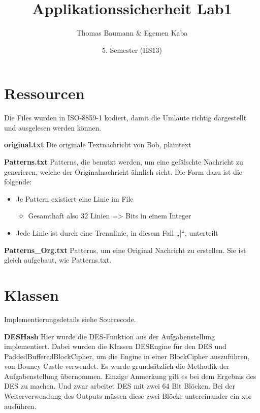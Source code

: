 \documentclass[10pt]{scrartcl}
\title{
\vspace{5cm}
Applikationssicherheit Lab1
}
\author{Thomas Baumann \& Egemen Kaba}
\date{5. Semester (HS13)}
\begin{document}
\maketitle
\thispagestyle{empty}

\newpage
{}

\section{Ressourcen}
Die Files wurden in ISO-8859-1 kodiert, damit die Umlaute richtig dargestellt und ausgelesen werden können.

\textbf{original.txt}\newline
Die originale Textnachricht von Bob, plaintext

\textbf{Patterns.txt}\newline
Patterns, die benutzt werden, um eine gefälschte Nachricht zu generieren, welche der Originalnachricht ähnlich sieht.
Die Form dazu ist die folgende:
\begin{itemize}
\item Je Pattern existiert eine Linie im File
\begin{itemize}
\item Gesamthaft also 32 Linien => Bits in einem Integer
\end{itemize}
\item Jede Linie ist durch eine Trennlinie, in diesem Fall „|“, unterteilt
\end{itemize}

\textbf{Patterns\_Org.txt}\newline
Patterns, um eine Original Nachricht zu erstellen.\newline
Sie ist gleich aufgebaut, wie Patterns.txt.
\section{Klassen}
Implementierungsdetails siehe Sourcecode.

\textbf{DESHash}\newline
Hier wurde die DES-Funktion aus der Aufgabenstellung implementiert. Dabei wurden die Klassen DESEngine für den DES und PaddedBufferedBlockCipher, um die Engine in einer BlockCipher auszuführen, von Bouncy Castle verwendet.
Es wurde grundsätzlich die Methodik der Aufgabenstellung übernommen. Einzige Anmerkung gilt es bei dem Ergebnis des DES zu machen. Und zwar arbeitet DES mit zwei 64 Bit Blöcken. Bei der Weiterverwendung des Outputs müssen diese zwei Blöcke untereinander ein xor ausführen.
\end{document}
